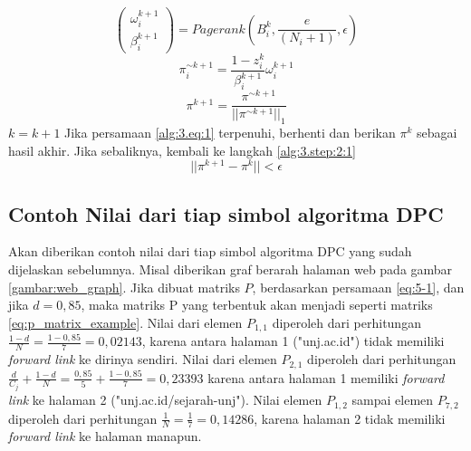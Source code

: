 \begin{breakablealgorithm}
\begin{algorithmic}[1]
\begin{equation}
			\begin{pmatrix}
				\omega^{k+1}_i \\
				\beta^{k+1}_i
			\end{pmatrix}
			= Pagerank(B^k_i, \frac{e}{(N_i + 1)}, \epsilon)
		\end{equation}
	\State \label{alg:3.step:3:3} \begin{equation} \pi^{\sim k+1}_i = \frac{1 - z^k_i}{\beta^{k+1}_i} \omega^{k+1}_i \end{equation}
	\State \label{alg:3.step:normalization} \begin{equation} \pi^{k+1} = \frac{\pi^{\sim k+1}}{||\pi^{\sim k+1}||_1} \end{equation}
	\State $k = k+1$
	\State Jika persamaan \ref{alg:3.eq:1} terpenuhi, berhenti dan berikan $\pi^{k}$ sebagai hasil akhir. Jika sebaliknya, kembali ke langkah \ref{alg:3.step:2:1}
		\begin{equation} \label{alg:3.eq:1} ||\pi^{k+1} - \pi^k|| < \epsilon \end{equation}
\end{algorithmic}
\end{breakablealgorithm}

\subsection{Contoh Nilai dari tiap simbol algoritma DPC}

Akan diberikan contoh nilai dari tiap simbol algoritma DPC yang sudah dijelaskan sebelumnya. Misal diberikan graf berarah halaman web pada gambar \ref{gambar:web_graph}. Jika dibuat matriks $P$, berdasarkan persamaan \ref{eq:5-1}, dan jika $d = 0,85$, maka matriks P yang terbentuk akan menjadi seperti matriks \ref{eq:p_matrix_example}. Nilai dari elemen $P_{1,1}$ diperoleh dari perhitungan $\frac{1 - d}{N} = \frac{1 - 0,85}{7} = 0,02143$, karena antara halaman 1 ("unj.ac.id") tidak memiliki \textit{forward link} ke dirinya sendiri. Nilai dari elemen $P_{2,1}$ diperoleh dari perhitungan  $\frac{d}{C_j} + \frac{1 - d}{N} = \frac{0,85}{5} + \frac{1 - 0,85}{7} = 0,23393$ karena antara halaman 1 memiliki \textit{forward link} ke halaman 2 ("unj.ac.id/sejarah-unj"). Nilai elemen $P_{1,2}$ sampai elemen $P_{7,2}$ diperoleh dari perhitungan $\frac{1}{N} = \frac{1}{7} = 0,14286$, karena halaman 2 tidak memiliki \textit{forward link} ke halaman manapun.

